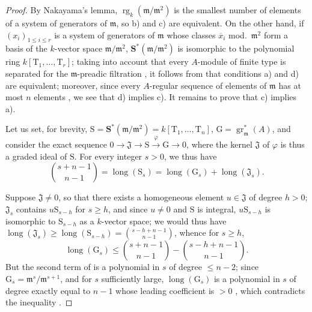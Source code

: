 \begin{proof}
By Nakayama's lemma, $\operatorname{rg}_k(\mathfrak{m}/\mathfrak{m}^2)$ is the smallest number of elements of a system of generators of $\mathfrak{m}$, so b) and c) are equivalent.
On the other hand, if $(x_i)_{1\leq i\leq r}$ is a system of generators of $\mathfrak{m}$ whose classes $\overline{x}_i$ mod.~$\mathfrak{m}^2$ form a basis of the $k$-vector space $\mathfrak{m}/\mathfrak{m}^2$, $\mathbf{S}^*(\mathfrak{m}/\mathfrak{m}^2)$ is isomorphic to the polynomial ring $k[\mathrm{T}_1,\ldots,\mathrm{T}_r]$;
taking into account that every $A$-module of finite type is separated for the $\mathfrak{m}$-preadic filtration , it follows from  that conditions a) and d) are equivalent;
moreover, since every $A$-regular sequence of elements of $\mathfrak{m}$ has at most $n$ elements , we see that d) implies c).
It remains to prove that c) implies a).

Let us set, for brevity, $\mathrm{S}=\mathbf{S}^*(\mathfrak{m}/\mathfrak{m}^2)=k[\mathrm{T}_1,\ldots,\mathrm{T}_n]$, $\mathrm{G}=\operatorname{gr}^*_\mathfrak{m}(A)$, and consider the exact sequence $0\to\mathfrak{J}\to\mathrm{S}\xrightarrow{\varphi}\mathrm{G}\to 0$, where the kernel $\mathfrak{J}$ of $\varphi$ is thus a graded ideal of $\mathrm{S}$.
For every integer $s>0$, we thus have
\[
\label{0.17.1.1.1}
  \binom{s+n-1}{n-1}=\operatorname{long}(\mathrm{S}_s)=\operatorname{long}(\mathrm{G}_s)+\operatorname{long}(\mathfrak{J}_s).
  \tag{17.1.1.1}
\]

Suppose $\mathfrak{J}\neq 0$, so that there exists a homogeneous element $u\in\mathfrak{J}$ of degree $h>0$;
$\mathfrak{J}_s$ contains $u\mathrm{S}_{s-h}$ for $s\geq h$, and since $u\neq 0$ and $\mathrm{S}$ is integral, $u\mathrm{S}_{s-h}$ is isomorphic to $\mathrm{S}_{s-h}$ as a $k$-vector space;
we would thus have $\operatorname{long}(\mathfrak{J}_s)\geq\operatorname{long}(\mathrm{S}_{s-h})=\binom{s-h+n-1}{n-1}$, whence for $s\geq h$,
\[
\label{0.17.1.1.2}
  \operatorname{long}(\mathrm{G}_s)\leq\binom{s+n-1}{n-1}-\binom{s-h+n-1}{n-1}.
  \tag{17.1.1.2}
\]
But the second term of  is a polynomial in $s$ of degree $\leq n-2$;
since $\mathrm{G}_s=\mathfrak{m}^s/\mathfrak{m}^{s+1}$, and for $s$ sufficiently large, $\operatorname{long}(\mathrm{G}_s)$ is a polynomial in $s$ of degree exactly equal to $n-1$ whose leading coefficient is $>0$ , which contradicts the inequality .
\end{proof}

